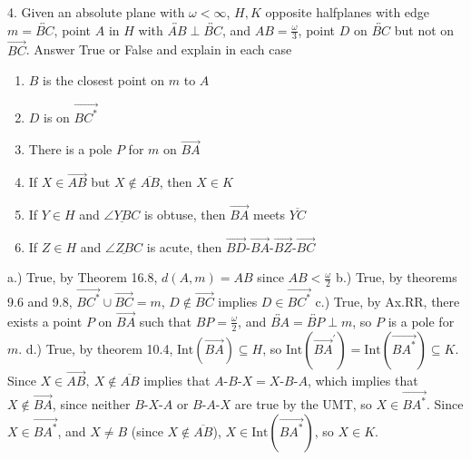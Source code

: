 \documentclass{report}
\begin{document}
    \bigbreak \noindent 
    \begin{mdframed}
        4. Given an absolute plane with $\omega < \infty$, $H,K$ opposite halfplanes with edge $m = \overleftrightarrow{BC}$, point $A$ in $H$ with $ \overleftrightarrow{AB} \perp \overleftrightarrow{BC}$, and $AB = \frac{\omega}{3} $, point $D$ on $\overleftrightarrow{BC}$ but not on $\overrightarrow{BC} $. Answer True or False and explain in each case
        \begin{enumerate}[label=(\alph*)]
            \item $B$ is the closest point on $m$ to $A$
            \item $D$ is on $\overrightarrow{BC^{*}} $
            \item There is a pole $P$ for $m$ on $\overrightarrow{BA}$
            \item If $X \in \overrightarrow{AB}$ but $X \not\in \overline{AB}$, then $X \in  K$
            \item If $Y \in H$ and $ \underline{\angle YBC}$ is obtuse, then $\overrightarrow{BA}$ meets $\overline{YC} $
            \item If $Z \in H$ and $ \underline{\angle ZBC}$ is acute, then $ \overrightarrow{BD}\text{-}\overrightarrow{BA}\text{-}\overrightarrow{BZ}\text{-}\overrightarrow{BC} $
        \end{enumerate}
    \end{mdframed}
    \bigbreak \noindent 
    a.) True, by Theorem 16.8, $d(A,m) = AB$ since $ AB < \frac{\omega}{2}$
    \bigbreak \noindent 
    b.) True, by theorems 9.6 and 9.8, $\overrightarrow{BC^{*}} \cup \overrightarrow{BC} = m$,  $ D \not\in  \overrightarrow{BC}$ implies $ D \in \overrightarrow{BC^{*}} $
    \bigbreak \noindent 
    c.) True, by Ax.RR, there exists a point $P$ on $\overrightarrow{BA}$ such that $BP = \frac{\omega}{2}$, and $ \overleftrightarrow{BA} = \overleftrightarrow{BP} \perp m$, so $P$ is a pole for $m$.
    \bigbreak \noindent 
    d.) True, by theorem 10.4, $\text{Int}(\overrightarrow{BA}) \subseteq H$, so $ \text{Int}(\overrightarrow{BA}^{\prime}) = \text{Int}(\overrightarrow{BA^{*}}) \subseteq K$. Since $X \in \overrightarrow{AB},\ X\not\in \overline{AB}$ implies that $ A\text{-}B\text{-}X = X\text{-}B\text{-}A$, which implies that $X \not\in \overrightarrow{BA}$, since neither $ B\text{-}X\text{-}A$ or $ B\text{-}A\text{-}X$ are true by the UMT, so $X \in \overrightarrow{BA^{*}}$. Since $X \in \overrightarrow{BA^{*}}$, and $X \ne B$ (since $ X \not\in \overline{AB}$), $X\in \text{Int}(\overrightarrow{BA^{*}})$, so $X \in K$.
\end{document}
